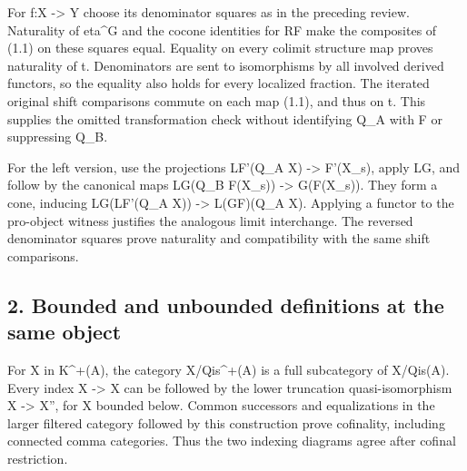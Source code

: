 For f:\allowbreak{}X \allowbreak{}-> Y choose its denominator squares as in the preceding review. Naturality of eta\^{}G and the cocone identities for RF\textquotesingle{} make the composites of (1.1)\allowbreak{} on these squares equal. Equality on every colimit structure map proves naturality of t. Denominators are sent to isomorphisms by all involved derived functors,\allowbreak{} so the equality also holds for every localized fraction. The iterated original shift comparisons commute on each map (1.1)\allowbreak{},\allowbreak{} and thus on t. This supplies the omitted transformation check without identifying Q\_\allowbreak{}A with F or suppressing Q\_\allowbreak{}B.

For the left version,\allowbreak{} use the projections LF'(Q\_\allowbreak{}A X)\allowbreak{} \allowbreak{}-> F'(X\_\allowbreak{}s)\allowbreak{},\allowbreak{} apply LG,\allowbreak{} and follow by the canonical maps LG(Q\_\allowbreak{}B F(X\_\allowbreak{}s)\allowbreak{})\allowbreak{} \allowbreak{}-> G(F(X\_\allowbreak{}s)\allowbreak{})\allowbreak{}. They form a cone,\allowbreak{} inducing LG(LF'(Q\_\allowbreak{}A X)\allowbreak{})\allowbreak{} \allowbreak{}-> L(GF)\allowbreak{}(Q\_\allowbreak{}A X)\allowbreak{}. Applying a functor to the pro-object witness justifies the analogous limit interchange. The reversed denominator squares prove naturality and compatibility with the same shift comparisons.

\subsection{2. Bounded and unbounded definitions at the same object}\label{proofs-5091-5900-bounded-and-unbounded-definitions-at-the-same-object}

For X in K\textasciicircum{}\allowbreak{}+(A)\allowbreak{},\allowbreak{} the category X/\allowbreak{}Qis\textasciicircum{}\allowbreak{}+(A)\allowbreak{} is a full subcategory of X/\allowbreak{}Qis(A)\allowbreak{}. Every index X \allowbreak{}-> X\textquotesingle{} can be followed by the lower truncation quasi-isomorphism X\textquotesingle{} \allowbreak{}-> X'',\allowbreak{} for X\textquotesingle\textquotesingle{} bounded below. Common successors and equalizations in the larger filtered category followed by this construction prove cofinality,\allowbreak{} including connected comma categories. Thus the two indexing diagrams agree after cofinal restriction.

